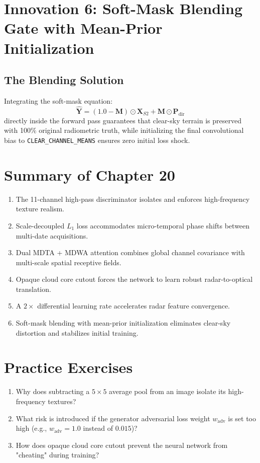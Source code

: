 \section{Innovation 6: Soft-Mask Blending Gate with Mean-Prior Initialization}
\subsection{The Blending Solution}
Integrating the soft-mask equation:
\begin{equation}
\hat{\mathbf{Y}} = (1.0 - \mathbf{M}) \odot \mathbf{X}_{S2} + \mathbf{M} \odot \mathbf{P}_{\text{dir}}
\end{equation}
directly inside the forward pass guarantees that clear-sky terrain is preserved with 100\% original radiometric truth, while initializing the final convolutional bias to \texttt{CLEAR\_CHANNEL\_MEANS} ensures zero initial loss shock.

\section{Summary of Chapter 20}
\begin{enumerate}
    \item The 11-channel high-pass discriminator isolates and enforces high-frequency texture realism.
    \item Scale-decoupled $L_1$ loss accommodates micro-temporal phase shifts between multi-date acquisitions.
    \item Dual MDTA + MDWA attention combines global channel covariance with multi-scale spatial receptive fields.
    \item Opaque cloud core cutout forces the network to learn robust radar-to-optical translation.
    \item A $2\times$ differential learning rate accelerates radar feature convergence.
    \item Soft-mask blending with mean-prior initialization eliminates clear-sky distortion and stabilizes initial training.
\end{enumerate}

\section{Practice Exercises}
\begin{enumerate}
    \item Why does subtracting a $5 \times 5$ average pool from an image isolate its high-frequency textures?
    \item What risk is introduced if the generator adversarial loss weight $w_{\text{adv}}$ is set too high (e.g., $w_{\text{adv}} = 1.0$ instead of $0.015$)?
    \item How does opaque cloud core cutout prevent the neural network from "cheating" during training?
\end{enumerate}

